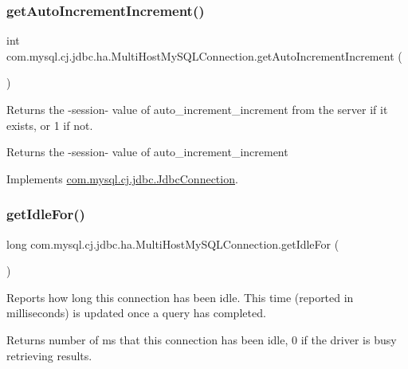 \subsubsection{\texorpdfstring{get\+Auto\+Increment\+Increment()}{getAutoIncrementIncrement()}}
{\footnotesize\ttfamily int com.\+mysql.\+cj.\+jdbc.\+ha.\+Multi\+Host\+My\+S\+Q\+L\+Connection.\+get\+Auto\+Increment\+Increment (\begin{DoxyParamCaption}{ }\end{DoxyParamCaption})}

Returns the -\/session-\/ value of \textquotesingle{}auto\+\_\+increment\+\_\+increment\textquotesingle{} from the server if it exists, or \textquotesingle{}1\textquotesingle{} if not.

\begin{DoxyReturn}{Returns}
the -\/session-\/ value of \textquotesingle{}auto\+\_\+increment\+\_\+increment\textquotesingle{} 
\end{DoxyReturn}


Implements \mbox{\hyperlink{interfacecom_1_1mysql_1_1cj_1_1jdbc_1_1_jdbc_connection_a06ded1274e682178c67fdb86f09fed5a}{com.\+mysql.\+cj.\+jdbc.\+Jdbc\+Connection}}.

\mbox{\label{classcom_1_1mysql_1_1cj_1_1jdbc_1_1ha_1_1_multi_host_my_s_q_l_connection_a640187b96b3d091f9b74a927c754098c}} 
\subsubsection{\texorpdfstring{get\+Idle\+For()}{getIdleFor()}}
{\footnotesize\ttfamily long com.\+mysql.\+cj.\+jdbc.\+ha.\+Multi\+Host\+My\+S\+Q\+L\+Connection.\+get\+Idle\+For (\begin{DoxyParamCaption}{ }\end{DoxyParamCaption})}

Reports how long this connection has been idle. This time (reported in milliseconds) is updated once a query has completed.

\begin{DoxyReturn}{Returns}
number of ms that this connection has been idle, 0 if the driver is busy retrieving results. 
\end{DoxyReturn}


